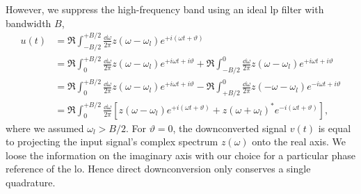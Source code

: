 However, we suppress the high-frequency band using an ideal \gls{lp} filter with bandwidth $B$,
\begin{equation}
	\begin{split}
		u(t)
		&=
		\Re
		\int_{-B/2}^{+B/2}\frac{\dd{\omega}}{2\pi}
		z(\omega-\omega_l)
		e^{+i(\omega t+\vartheta)}
		\\
		&=
		\Re
		\int_{0}^{+B/2}\frac{\dd{\omega}}{2\pi}
		z(\omega-\omega_l)
		e^{+i\omega t+i\vartheta}
		+
		\Re
		\int_{-B/2}^{0}\frac{\dd{\omega}}{2\pi}
		z(\omega-\omega_l)
		e^{+i\omega t+i\vartheta}
		\\
		&=
		\Re
		\int_{0}^{+B/2}\frac{\dd{\omega}}{2\pi}
		z(\omega-\omega_l)
		e^{+i\omega t+i\vartheta}
		-
		\Re
		\int_{+B/2}^{0}\frac{\dd{\omega}}{2\pi}
		z(-\omega-\omega_l)
		e^{-i\omega t+i\vartheta}
		\\
		&=
		\Re
		\int_{0}^{+B/2}\frac{\dd{\omega}}{2\pi}
		\left[
			z(\omega-\omega_l)
			e^{+i(\omega t+\vartheta)}
			+
			z(\omega+\omega_l)^*
			e^{-i(\omega t+\vartheta)}
		\right]
		,
	\end{split}
	\label{eq:downconversion_real}
\end{equation}
where we assumed $\omega_l>B/2$.
For $\vartheta=0$, the downconverted signal $v(t)$ is equal to projecting the input signal's complex spectrum $z(\omega)$ onto the real axis.
We loose the information on the imaginary axis with our choice for a particular phase reference of the \gls{lo}.
Hence direct downconversion only conserves a single quadrature.

